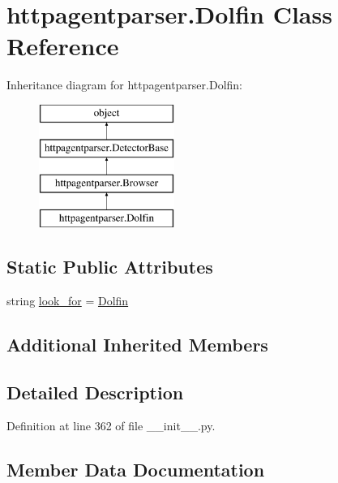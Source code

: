 \hypertarget{classhttpagentparser_1_1_dolfin}{}\section{httpagentparser.\+Dolfin Class Reference}
\label{classhttpagentparser_1_1_dolfin}
Inheritance diagram for httpagentparser.\+Dolfin\+:\begin{figure}[H]
\begin{center}
\leavevmode
\includegraphics[height=4.000000cm]{classhttpagentparser_1_1_dolfin}
\end{center}
\end{figure}
\subsection*{Static Public Attributes}
\begin{DoxyCompactItemize}
\item 
string \hyperlink{classhttpagentparser_1_1_dolfin_ac71f8bc71e3caf34c07a99f6523f20e1}{look\+\_\+for} = \textquotesingle{}\hyperlink{classhttpagentparser_1_1_dolfin}{Dolfin}\textquotesingle{}
\end{DoxyCompactItemize}
\subsection*{Additional Inherited Members}


\subsection{Detailed Description}


Definition at line 362 of file \+\_\+\+\_\+init\+\_\+\+\_\+.\+py.



\subsection{Member Data Documentation}
\hypertarget{classhttpagentparser_1_1_dolfin_ac71f8bc71e3caf34c07a99f6523f20e1}{}\label{classhttpagentparser_1_1_dolfin_ac71f8bc71e3caf34c07a99f6523f20e1} 
